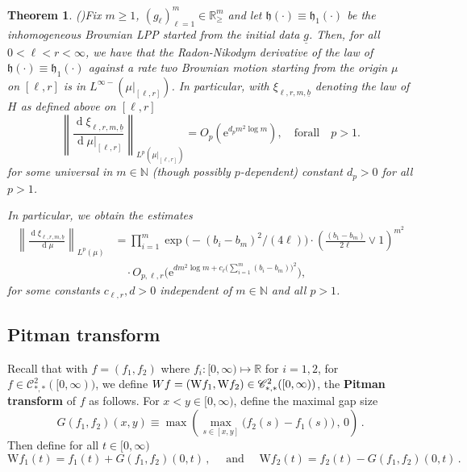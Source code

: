 \documentclass[11pt, reqno]{amsart}
\numberwithin{equation}{section}
\newcounter{dummy} \numberwithin{dummy}{section}
\newtheorem{theorem}[dummy]{Theorem}
\newcommand{\N}{\ensuremath{\mathbb{N}}}
\newcommand{\R}{\ensuremath{\mathbb{R}}}
\newcommand{\norm}[1]{\left\lVert#1\right\rVert}
\newcommand{\diff}{\ensuremath{\operatorname{d}\!}}
\begin{document}
\begin{theorem}(\cite[Theorem~7.1]{tassopoulos2025inhomogeneousbrownian})\label{thm: main companion}
     Fix $m\ge 1$, $(g_\ell)_{\ell =1}^m \in\R^m_{\ge}$ and let $\mathfrak{h}(\cdot)\equiv \mathfrak{h}_1(\cdot)$ be the inhomogeneous Brownian LPP started from the initial data $\underline{g}$. Then, for all $0<\ell<r<\infty$, we have that the Radon-Nikodym derivative of the law of $\mathfrak{h}(\cdot)\equiv \mathfrak{h}_1(\cdot)$ against a rate two Brownian motion starting from the origin $\mu$ on $[\ell,r]$ is in $L^{\infty-}(\mu\vert_{[\ell, r]})$. In particular, with $\xi_{\ell, r, m, \underline{b}}$ denoting the law of $H$ as defined above on $[\ell, r]$
     \begin{equation*}
         \norm{\frac{\diff \xi_{\ell, r, m, \underline{b}}}{\diff\mu\vert_{[\ell, r]}}}_{L^p(\mu\vert_{[\ell, r]})} =  O_p(\mathrm{e}^{d_pm^2\log m}),\quad \mathrm{for all}\quad p>1.
     \end{equation*}
     for some universal in $m\in \N$ (though possibly $p$-dependent) constant $d_p>0$ for all $p>1$.

     In particular, we obtain the estimates
     \begin{equation*}
     \begin{array}{cc}
         \norm{\frac{\diff {\xi}_{\ell, r, m, \underline{b}}}{\diff\mu}}_{L^p(\mu)} &= \displaystyle\prod^m_{i=1}\exp\big(-(b_i-b_m)^2/(4\ell)\big)\cdot \left(\frac{(b_1-b_m)}{2\ell}\lor 1\right)^{m^2}\\
         & \quad \cdot O_{p,\ell, r}\Bigg(\mathrm{e}^{d m^2\log m + c_{\ell} \big(\sum_{i=1}^m (b_i-b_m)\big)^2}\Bigg),
    \end{array}
     \end{equation*}
     for some constants $c_{\ell,r},d>0$ independent of $m\in \N$ and all $p>1$.
\end{theorem}

\subsection{Pitman transform}

Recall that with $f=(f_1,f_2)$ where $f_i:[0,\infty)\mapsto \R$ for $i=1,2$, for $f\in \mathscr{C}^2_{*,*}([0,\infty))$, we define $\mathrm \mathrm{W}f=(\mathrm{W} f_1,\mathrm{W} f_2)\in \mathscr{C}^2_{*,*}([0,\infty))$, the \textbf{Pitman transform} of $f$ as follows. For $x<y\in [0,\infty)$, define the maximal gap size
\begin{equation*}G(f_1,f_2)(x,y)\equiv\max\left(\max_{s\in [x,y]}\big(f_2(s)-f_1(s)\big)\,,\,0\right)\,.\end{equation*}
Then define for all $t\in [0,\infty)$
\begin{equation}\label{eq: pitmantrans}
\mathrm{W} f_1(t)=f_1(t)+G(f_1,f_2)(0,t)\,, \quad \mbox{ and }\quad \mathrm{W} f_2(t)=f_2(t)-G(f_1,f_2)(0,t)\,.
\end{equation}
\end{document}
